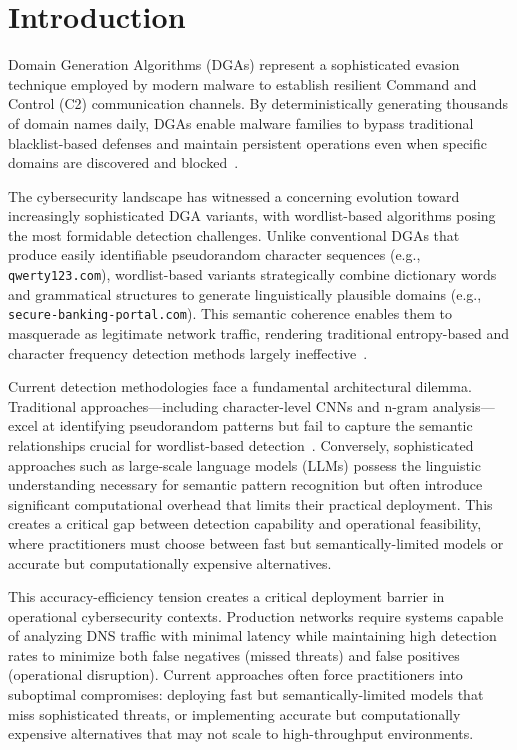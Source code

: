 \documentclass[a4paper]{llncs}
\begin{document}
\section{Introduction}
\label{sec:intro}

Domain Generation Algorithms (DGAs) represent a sophisticated evasion technique employed by modern malware to establish resilient Command and Control (C2) communication channels. By deterministically generating thousands of domain names daily, DGAs enable malware families to bypass traditional blacklist-based defenses and maintain persistent operations even when specific domains are discovered and blocked~\cite{plohmann2016comprehensive}.

The cybersecurity landscape has witnessed a concerning evolution toward increasingly sophisticated DGA variants, with wordlist-based algorithms posing the most formidable detection challenges. Unlike conventional DGAs that produce easily identifiable pseudorandom character sequences (e.g., \texttt{qwerty123.com}), wordlist-based variants strategically combine dictionary words and grammatical structures to generate linguistically plausible domains (e.g., \texttt{secure-banking-portal.com}). This semantic coherence enables them to masquerade as legitimate network traffic, rendering traditional entropy-based and character frequency detection methods largely ineffective~\cite{yang2019detecting,Vu2021}.

Current detection methodologies face a fundamental architectural dilemma. Traditional approaches—including character-level CNNs and n-gram analysis—excel at identifying pseudorandom patterns but fail to capture the semantic relationships crucial for wordlist-based detection~\cite{catania2019analysis}. Conversely, sophisticated approaches such as large-scale language models (LLMs) possess the linguistic understanding necessary for semantic pattern recognition but often introduce significant computational overhead that limits their practical deployment. This creates a critical gap between detection capability and operational feasibility, where practitioners must choose between fast but semantically-limited models or accurate but computationally expensive alternatives.

This accuracy-efficiency tension creates a critical deployment barrier in operational cybersecurity contexts. Production networks require systems capable of analyzing DNS traffic with minimal latency while maintaining high detection rates to minimize both false negatives (missed threats) and false positives (operational disruption). Current approaches often force practitioners into suboptimal compromises: deploying fast but semantically-limited models that miss sophisticated threats, or implementing accurate but computationally expensive alternatives that may not scale to high-throughput environments.
\end{document}
